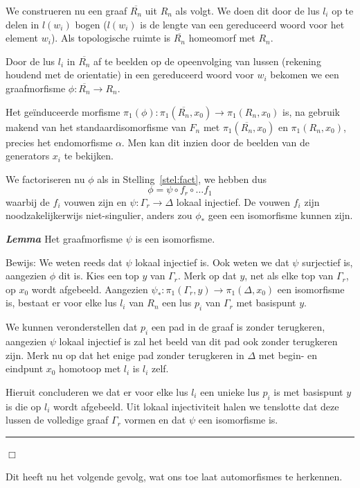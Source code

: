 \documentclass[12pt]{book}
\newcommand{\bew}{{\sc Bewijs: }}
\newcommand{\B}{\rule{1mm}{0mm} \hfill $\Box$ }
\newenvironment{lem}{\begin{lemh}{\em {\bf Lemma }}}{\end{lemh}}
\begin{document}
We construeren nu een graaf $\overline{R_n}$ uit $R_n$ als volgt. We doen dit door de lus $l_i$ op te delen in $l(w_i)$ bogen ($l(w_i)$ is de lengte van een gereduceerd woord voor het element $w_i$). Als topologische ruimte is $\overline{R_n}$ homeomorf met $R_n$.

Door de lus $l_i$ in $\overline{R_n}$ af te beelden op de opeenvolging van lussen (rekening houdend met de orientatie) in een gereduceerd woord voor $w_i$ bekomen we een graafmorfisme $\phi : \overline{R_n} \to R_n$.

Het ge\"induceerde morfisme $\pi_1(\phi)  \colon \pi_1(\overline{R_n},x_0) \to \pi_1(R_n,x_0)$ is, na gebruik makend van het standaardisomorfisme van $F_n$ met $\pi_1(\overline{R_n},x_0)$ en $\pi_1(R_n,x_0)$, precies het endomorfisme $\alpha$. Men kan dit inzien door de beelden van de generators $x_i$ te bekijken.

We factoriseren nu $\phi$ als in Stelling~\ref{stel:fact}, we hebben dus 
$$
\phi = \psi \circ f_r \circ \dots f_1
$$
waarbij de $f_i$ vouwen zijn en $\psi\colon \Gamma_r \to \Delta$ lokaal injectief. De vouwen $f_i$ zijn noodzakelijkerwijs niet-singulier, anders zou $\phi_*$ geen een isomorfisme kunnen zijn.

\begin{lem}
Het graafmorfisme $\psi$ is een isomorfisme.
\end{lem}
\bew
We weten reeds dat $\psi$ lokaal injectief is. Ook weten we dat $\psi$ surjectief is, aangezien $\phi$ dit is. Kies een top $y$ van $\Gamma_r$. Merk op dat $y$, net als elke top van $\Gamma_r$, op $x_0$ wordt afgebeeld. Aangezien $\psi_*\colon \pi_1(\Gamma_r,y) \to \pi_1(\Delta,x_0)$ een isomorfisme is, bestaat er voor elke lus $l_i$ van $R_n$ een lus $p_i$ van $\Gamma_r$ met basispunt $y$.

We kunnen veronderstellen dat $p_i$ een pad in de graaf is zonder terugkeren, aangezien $\psi$ lokaal injectief is zal het beeld van dit pad ook zonder terugkeren zijn. Merk nu op dat het enige pad zonder terugkeren in $\Delta$ met begin- en eindpunt $x_0$ homotoop met $l_i$ is $l_i$ zelf.

Hieruit concluderen we dat er voor elke lus $l_i$ een unieke lus $p_i$ is met basispunt $y$ is die op $l_i$ wordt afgebeeld. Uit lokaal injectiviteit halen we tenslotte dat deze lussen de volledige graaf $\Gamma_r$ vormen en dat $\psi$ een isomorfisme is.
\B

Dit heeft nu het volgende gevolg, wat ons toe laat automorfismes te herkennen.
\end{document}
